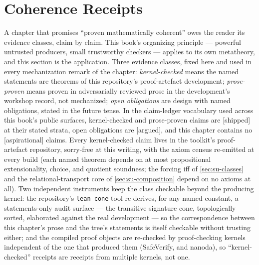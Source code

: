 \section{Coherence Receipts}
\label{sec:su-receipts}

A chapter that promises ``proven mathematically coherent'' owes the
reader its evidence classes, claim by claim. This book's organizing
principle --- powerful untrusted producers, small trustworthy
checkers --- applies to its own metatheory, and this section is the
application. Three evidence classes, fixed here and used in every
mechanization remark of the chapter: \emph{kernel-checked} means
the named statements are theorems of this repository's
proof-artefact development;
\emph{prose-proven} means proven in adversarially reviewed prose in
the development's workshop record, not mechanized; \emph{open
obligations} are design with named obligations, stated in the
future tense. In the claim-ledger vocabulary used across this
book's public surfaces, kernel-checked and prose-proven claims are
[shipped] at their stated strata, open obligations are [argued],
and this chapter contains no [aspirational] claims. Every
kernel-checked claim lives in the toolkit's
proof-artefact repository, sorry-free at this writing, with the
axiom census re-emitted at every build (each named theorem depends
on at most propositional extensionality, choice, and quotient
soundness; the forcing iff of \autoref{sec:su-classes} and the
relational-transport core of \autoref{sec:su-composition}
depend on no axioms at all). Two independent instruments keep the
class checkable beyond the producing kernel: the repository's
\texttt{lean-cone}
tool re-derives, for any named constant, a statements-only audit
surface --- the transitive signature cone, topologically sorted,
elaborated against the real development --- so the correspondence
between this chapter's prose and the tree's statements is itself
checkable without trusting either; and the compiled proof objects
are re-checked by proof-checking kernels independent of the one
that produced them (SafeVerify, and nanoda), so ``kernel-checked''
receipts are receipts from multiple kernels, not one.

